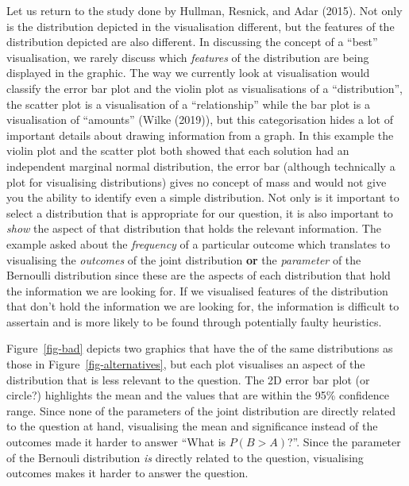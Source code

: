 \documentclass[
  letterpaper,
  DIV=11,
  numbers=noendperiod]{scrartcl}
\begin{document}
Let us return to the study done by Hullman, Resnick, and Adar (2015).
Not only is the distribution depicted in the visualisation different,
but the features of the distribution depicted are also different. In
discussing the concept of a ``best'' visualisation, we rarely discuss
which \emph{features} of the distribution are being displayed in the
graphic. The way we currently look at visualisation would classify the
error bar plot and the violin plot as visualisations of a
``distribution'', the scatter plot is a visualisation of a
``relationship'' while the bar plot is a visualisation of ``amounts''
(Wilke (2019)), but this categorisation hides a lot of important details
about drawing information from a graph. In this example the violin plot
and the scatter plot both showed that each solution had an independent
marginal normal distribution, the error bar (although technically a plot
for visualising distributions) gives no concept of mass and would not
give you the ability to identify even a simple distribution. Not only is
it important to select a distribution that is appropriate for our
question, it is also important to \emph{show} the aspect of that
distribution that holds the relevant information. The example asked
about the \emph{frequency} of a particular outcome which translates to
visualising the \emph{outcomes} of the joint distribution \textbf{or}
the \emph{parameter} of the Bernoulli distribution since these are the
aspects of each distribution that hold the information we are looking
for. If we visualised features of the distribution that don't hold the
information we are looking for, the information is difficult to
assertain and is more likely to be found through potentially faulty
heuristics.

Figure~\ref{fig-bad} depicts two graphics that have the of the same
distributions as those in Figure~\ref{fig-alternatives}, but each plot
visualises an aspect of the distribution that is less relevant to the
question. The 2D error bar plot (or circle?) highlights the mean and the
values that are within the 95\% confidence range. Since none of the
parameters of the joint distribution are directly related to the
question at hand, visualising the mean and significance instead of the
outcomes made it harder to answer ``What is \(P(B>A)\)?''. Since the
parameter of the Bernouli distribution \emph{is} directly related to the
question, visualising outcomes makes it harder to answer the question.
\end{document}
